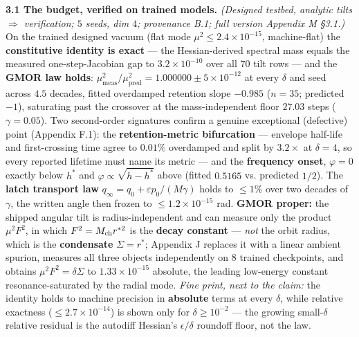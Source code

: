 \documentclass[10pt]{article}
\begin{document}
\textbf{3.1 The budget, verified on trained models.} \emph{(Designed testbed, analytic tilts $\Rightarrow$ verification; $5$ seeds, dim $4$; provenance B.1; full version Appendix M \S3.1.)} On the trained designed vacuum (flat mode $\mu^2\le2.4\!\times\!10^{-15}$, machine-flat) the \textbf{constitutive identity is exact} --- the Hessian-derived spectral mass equals the measured one-step-Jacobian gap to $3.2\!\times\!10^{-10}$ over all $70$ tilt rows --- and the \textbf{GMOR law holds}: $\mu^2_{\mathrm{meas}}/\mu^2_{\mathrm{pred}}=1.000000\pm5\!\times\!10^{-12}$ at every $\delta$ and seed across $4.5$ decades, fitted overdamped retention slope $-0.985$ ($n=35$; predicted $-1$), saturating past the crossover at the mass-independent floor $27.03$ steps ($\gamma=0.05$). Two second-order signatures confirm a genuine exceptional (defective) point (Appendix F.1): the \textbf{retention-metric bifurcation} --- envelope half-life and first-crossing time agree to $0.01\%$ overdamped and split by $3.2\times$ at $\delta=4$, so every reported lifetime must name its metric --- and the \textbf{frequency onset}, $\varphi=0$ exactly below $h^*$ and $\varphi\propto\sqrt{h-h^*}$ above (fitted $0.5165$ vs. predicted $1/2$). The \textbf{latch transport law} $q_\infty=q_0+\varepsilon p_0/(M\gamma)$ holds to $\le1\%$ over two decades of $\gamma$, the written angle then frozen to $\le1.2\!\times\!10^{-15}$ rad. \textbf{GMOR proper:} the shipped angular tilt is radius-independent and can measure only the product $\mu^2F^2$, in which $F^2=M_{\rm ch}r^{*2}$ is the \textbf{decay constant} --- \emph{not} the orbit radius, which is the \textbf{condensate} $\Sigma=r^*$; Appendix J replaces it with a linear ambient spurion, measures all three objects independently on $8$ trained checkpoints, and obtains $\mu^2F^2=\delta\Sigma$ to $1.33\!\times\!10^{-15}$ absolute, the leading low-energy constant resonance-saturated by the radial mode. \emph{Fine print, next to the claim:} the identity holds to machine precision in \textbf{absolute} terms at every $\delta$, while relative exactness ($\le2.7\!\times\!10^{-14}$) is shown only for $\delta\ge10^{-2}$ --- the growing small-$\delta$ relative residual is the autodiff Hessian's $\epsilon/\delta$ roundoff floor, not the law.
\end{document}

